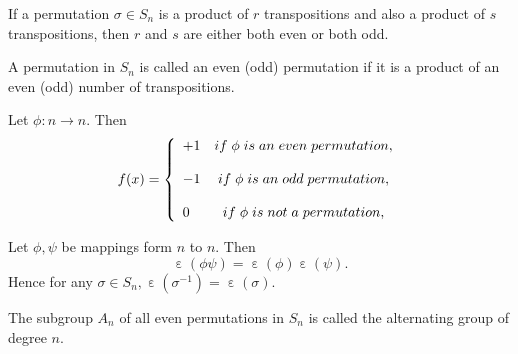 \begin{teo}
    If a permutation $\sigma\in S_n$ is a product of $r$ transpositions and also a product of $s$ transpositions, then $r$ and $s$ are either both even or both odd.
\end{teo}

\begin{defi}
    A permutation in $S_n$ is called an even (odd) permutation if it is a product of an even (odd) number of transpositions.
\end{defi}
\begin{defi}
    Let $\phi:n\rightarrow n$. Then
    \begin{equation*}
        f(x)= \left\{ \begin{array}{lcc}
             +1 & if\hspace{.1cm}\phi\hspace{.1cm}is\hspace{.1cm}an\hspace{.1cm}even\hspace{.1cm}permutation,  \\
             \\ -1 &  if\hspace{.1cm}\phi\hspace{.1cm}is\hspace{.1cm}an\hspace{.1cm}odd\hspace{.1cm}permutation, \\
             \\0 & if\hspace{.1cm}\phi\hspace{.1cm}is\hspace{.1cm}not\hspace{.1cm}a\hspace{.1cm}permutation,
             \end{array}
   \right.
    \end{equation*}
\end{defi}
\begin{lema}
    Let $\phi,\psi$ be mappings form $n$ to $n$. Then 
    \begin{equation*}
        \upepsilon(\phi\psi)=\upepsilon(\phi)\upepsilon(\psi).
    \end{equation*}
    Hence for any $\sigma\in S_n, \upepsilon(\sigma^{-1})=\upepsilon(\sigma)$.
\end{lema}
\begin{defi}
    The subgroup $A_n$ of all even permutations in $S_n$ is called the alternating group of degree $n$.
\end{defi}